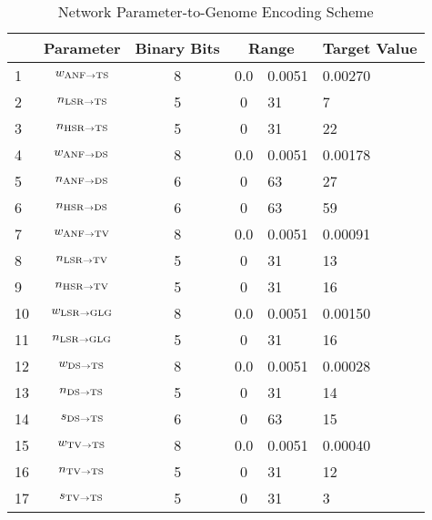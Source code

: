 \begin{table}[tp]
 \centering
 \caption{Network Parameter-to-Genome Encoding Scheme}\label{tab:GA:Genome}
 \begin{tabularx}{\textwidth}{lcccXX}
\hline
  &           Parameter           & Binary Bits & \multicolumn{2}{c}{Range} & Target Value \\[0.5ex]\hline
1  & $w_{{\rm ANF}\to {\rm TS}} $  &      8      & 0.0 &       0.0051        & 0.00270 \\ %
2  & $n_{{\rm LSR}\to {\rm TS}} $  &      5      &  0  &         31          & 7 \\ %
3  & $n_{{\rm HSR}\to {\rm TS}} $  &      5      &  0  &         31          & 22 \\ %
4  & $w_{{\rm ANF}\to {\rm DS}} $  &      8      & 0.0 &       0.0051        & 0.00178 \\ %
5  & $n_{{\rm ANF}\to {\rm DS}} $  &      6      &  0  &         63          & 27 \\ %
6  & $n_{{\rm HSR}\to {\rm DS}} $  &      6      &  0  &         63          & 59 \\ %
7  & $w_{{\rm ANF}\to {\rm TV}} $  &      8      & 0.0 &       0.0051        & 0.00091 \\ %
8  & $n_{{\rm LSR}\to {\rm TV}} $  &      5      &  0  &         31          & 13 \\ %
9  & $n_{{\rm HSR}\to {\rm TV}} $  &      5      &  0  &         31          & 16 \\ %
10 & $w_{{\rm LSR}\to {\rm GLG}} $ &      8      & 0.0 &       0.0051        & 0.00150 \\   %
11 & $n_{{\rm LSR}\to {\rm GLG}} $ &      5      &  0  &         31          & 16 \\   %
12 &  $w_{{\rm DS}\to {\rm TS}} $  &      8      & 0.0 &       0.0051        & 0.00028 \\ %
13 &  $n_{{\rm DS}\to {\rm TS}} $  &      5      &  0  &         31          & 14 \\ %
14 &  $s_{{\rm DS}\to {\rm TS}} $  &      6      &  0  &         63          & 15 \\   %
15 &  $w_{{\rm TV}\to {\rm TS}} $  &      8      & 0.0 &       0.0051        & 0.00040 \\ %
16 &  $n_{{\rm TV}\to {\rm TS}} $  &      5      &  0  &         31          & 12 \\ %
17 &  $s_{{\rm TV}\to {\rm TS}} $  &      5      &  0  &         31          & 3 \\   %

\end{tabularx}
\end{table}
